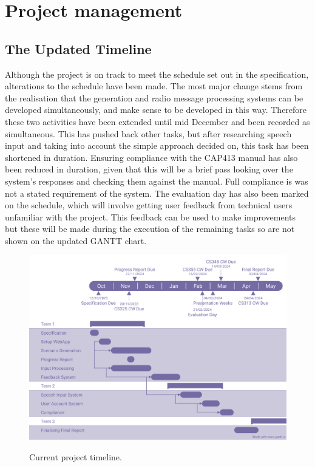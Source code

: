\section{Project management}


\subsection{The Updated Timeline}
Although the project is on track to meet the schedule set out in the specification, alterations to the schedule have been made. The most major change stems from the realisation that the generation and radio message processing systems can be developed simultaneously, and make sense to be developed in this way. Therefore these two activities have been extended until mid December and been recorded as simultaneous. This has pushed back other tasks, but after researching speech input and taking into account the simple approach decided on, this task has been shortened in duration. Ensuring compliance with the CAP413 manual has also been reduced in duration, given that this will be a brief pass looking over the system's responses and checking them against the manual. Full compliance is was not a stated requirement of the system. The evaluation day has also been marked on the schedule, which will involve getting user feedback from technical users unfamiliar with the project. This feedback can be used to make improvements but these will be made during the execution of the remaining tasks so are not shown on the updated GANTT chart.

\begin{figure}[H]
    \centering
	\includegraphics[scale = 0.3]{../document-resources/images/GANTT-for-Progress-Report}
    \label{progress-report-gantt}
    \caption{Current project timeline.}
\end{figure}

